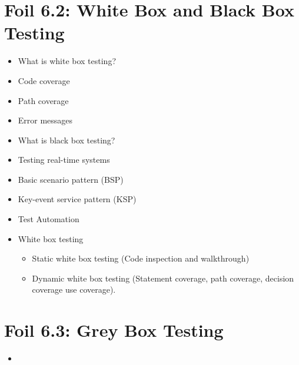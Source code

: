 	\section{Foil 6.2: White Box and Black Box Testing}
		\begin{itemize}
			\item What is white box testing?
			\item Code coverage
			\item Path coverage
			\item Error messages
			\item What is black box testing?
			\item Testing real-time systems
			\item Basic scenario pattern (BSP)
			\item Key-event service pattern (KSP)
			\item Test Automation
			\item White box testing
				\begin{itemize}
					\item Static white box testing (Code inspection and walkthrough)
					\item Dynamic white box testing (Statement coverage, path coverage, decision coverage
					use coverage).
				\end{itemize}
		\end{itemize}


	\section{Foil 6.3: Grey Box Testing}
		\begin{itemize}
			\item 
		\end{itemize}

	\section{}


